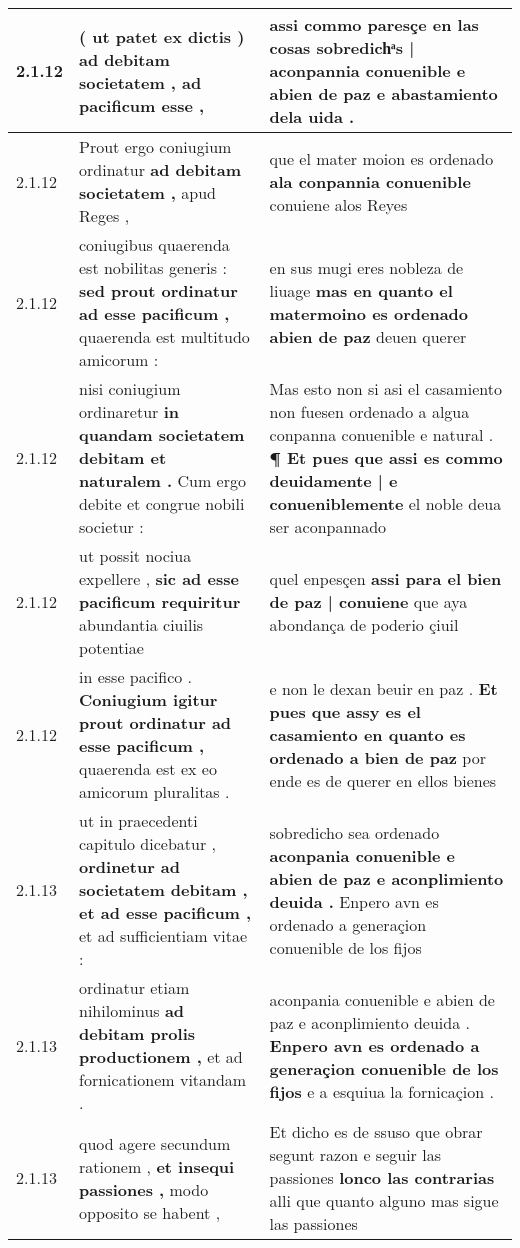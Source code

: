 \begin{tabular}{|p{1cm}|p{6.5cm}|p{6.5cm}|}
2.1.12 & ( ut patet ex dictis ) \textbf{ ad debitam societatem , } ad pacificum esse , & assi commo paresçe en las cosas \textbf{ sobredichͣs | aconpannia conuenible } e abien de paz e abastamiento dela uida . \\\hline
2.1.12 & Prout ergo coniugium ordinatur \textbf{ ad debitam societatem , } apud Reges , & que el mater moion es ordenado \textbf{ ala conpannia conuenible } conuiene alos Reyes \\\hline
2.1.12 & coniugibus quaerenda est nobilitas generis : \textbf{ sed prout ordinatur ad esse pacificum , } quaerenda est multitudo amicorum : & en sus mugi eres nobleza de liuage \textbf{ mas en quanto el matermoino es ordenado abien de paz } deuen querer \\\hline
2.1.12 & nisi coniugium ordinaretur \textbf{ in quandam societatem debitam et naturalem . } Cum ergo debite et congrue nobili societur : & Mas esto non si asi el casamiento non fuesen ordenado a algua conpanna conuenible e natural . \textbf{ ¶ Et pues que assi es commo deuidamente | e conueniblemente } el noble deua ser aconpannado \\\hline
2.1.12 & ut possit nociua expellere , \textbf{ sic ad esse pacificum requiritur } abundantia ciuilis potentiae & quel enpesçen \textbf{ assi para el bien de paz | conuiene } que aya abondança de poderio çiuil \\\hline
2.1.12 & in esse pacifico . \textbf{ Coniugium igitur prout ordinatur ad esse pacificum , } quaerenda est ex eo amicorum pluralitas . & e non le dexan beuir en paz . \textbf{ Et pues que assy es el casamiento en quanto es ordenado a bien de paz } por ende es de querer en ellos bienes \\\hline
2.1.13 & ut in praecedenti capitulo dicebatur , \textbf{ ordinetur ad societatem debitam , et ad esse pacificum , } et ad sufficientiam vitae : & sobredicho sea ordenado \textbf{ aconpania conuenible e abien de paz e aconplimiento deuida . } Enpero avn es ordenado a generaçion conuenible de los fijos \\\hline
2.1.13 & ordinatur etiam nihilominus \textbf{ ad debitam prolis productionem , } et ad fornicationem vitandam . & aconpania conuenible e abien de paz e aconplimiento deuida . \textbf{ Enpero avn es ordenado a generaçion conuenible de los fijos } e a esquiua la fornicaçion . \\\hline
2.1.13 & quod agere secundum rationem , \textbf{ et insequi passiones , } modo opposito se habent , & Et dicho es de ssuso que obrar segunt razon e seguir las passiones \textbf{ lonco las contrarias } alli que quanto alguno mas sigue las passiones \\\hline

\end{tabular}
